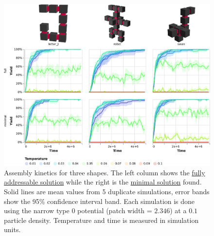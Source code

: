 \begin{figure}[ht]
    \centering
    \includegraphics[width=\linewidth]{figures/patchysim/shapeKinetics.eps}
    \caption{Assembly kinetics for three shapes. The left column shows the  \href{https://akodiat.github.io/polycubes/?assemblyMode=stochastic&rule=89010204000099099e00a20c0101861000000115920000009501020000000119020000000101021c0000010102000020010102008e00}{fully addressable solution} while the right is the \href{https://akodiat.github.io/polycubes/?assemblyMode=stochastic&rule=8f0b080b000b0b00000012008791000000000c0005000000000088000000}{minimal solution} found. Solid lines are mean values from 5 duplicate simulations, error bands show the 95\% confidence interval band. Each simulation is done using the narrow type \(0\) potential (patch width = \(2.346\)) at a \(0.1\) particle density. Temperature and time is measured in simulation units.}
    \label{fig:swanKinetics}
\end{figure}


